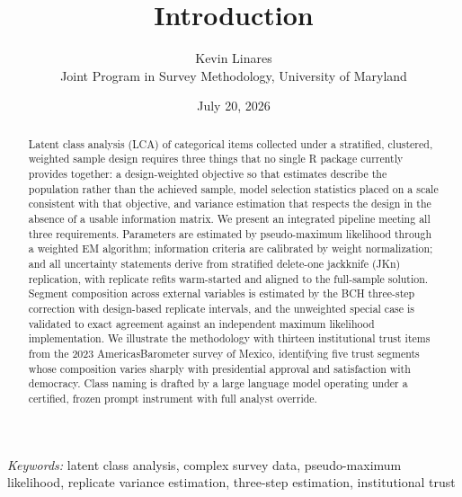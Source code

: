 \documentclass[
  12pt]{article}
\begin{document}
\def\spacingset#1{\renewcommand{\baselinestretch}%
{#1}\small\normalsize} \spacingset{1}



\date{July 20, 2026}
\title{\bf Introduction}
\author{
Kevin Linares\\
Joint Program in Survey Methodology, University of Maryland\\
}
\maketitle

\bigskip
\bigskip
\begin{abstract}
Latent class analysis (LCA) of categorical items collected under a
stratified, clustered, weighted sample design requires three things that
no single R package currently provides together: a design-weighted
objective so that estimates describe the population rather than the
achieved sample, model selection statistics placed on a scale consistent
with that objective, and variance estimation that respects the design in
the absence of a usable information matrix. We present an integrated
pipeline meeting all three requirements. Parameters are estimated by
pseudo-maximum likelihood through a weighted EM algorithm; information
criteria are calibrated by weight normalization; and all uncertainty
statements derive from stratified delete-one jackknife (JKn)
replication, with replicate refits warm-started and aligned to the
full-sample solution. Segment composition across external variables is
estimated by the BCH three-step correction with design-based replicate
intervals, and the unweighted special case is validated to exact
agreement against an independent maximum likelihood implementation. We
illustrate the methodology with thirteen institutional trust items from
the 2023 AmericasBarometer survey of Mexico, identifying five trust
segments whose composition varies sharply with presidential approval and
satisfaction with democracy. Class naming is drafted by a large language
model operating under a certified, frozen prompt instrument with full
analyst override.
\end{abstract}

\noindent%
{\it Keywords:} latent class analysis, complex survey
data, pseudo-maximum likelihood, replicate variance
estimation, three-step estimation, institutional trust
\vfill

\newpage
\spacingset{1.9} %
\end{document}
